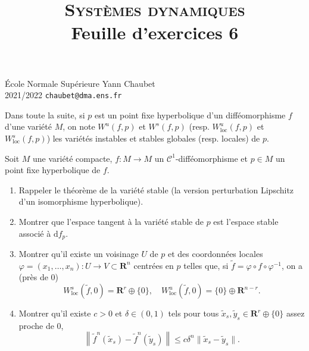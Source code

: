 \documentclass[a4paper,10pt,openany]{article}
\title{\textsc{Syst\`emes dynamiques} \\ Feuille d'exercices 6}
\date{}
\author{}
\theoremstyle{plain}
\theoremstyle{definition}
\newcommand{\dd}{\mathrm{d}}
\newcommand{\R}{\mathbf{R}}
\begin{document}
{\noindent \'Ecole Normale Sup\'erieure  \hfill Yann Chaubet } \\
{2021/2022 \hfill \texttt{chaubet@dma.ens.fr}}
{\let\newpage\relax\maketitle}
\maketitle
\noindent Dans toute la suite, si $p$ est un point fixe hyperbolique d'un diff\'eomorphisme $f$ d'une vari\'et\'e $M$, on note $W^u(f,p)$ et $W^s(f,p)$ (resp. $W^u_\mathrm{loc}(f,p)$ et $W^s_\mathrm{loc}(f,p)$) les vari\'et\'es instables et stables globales (resp. locales) de $p$.

\vspace{0.6cm}

 \vspace{1.5mm} 

\noindent Soit $M$ une vari\'et\'e compacte, $f : M \to M$ un $\mathcal{C}^1$-diff\'eomorphisme et $p \in M$ un point fixe hyperbolique de $f$. 
\begin{enumerate}
\item Rappeler le th\'eor\`eme de la vari\'et\'e stable (la version perturbation Lipschitz d'un isomorphisme hyperbolique).
\item Montrer que l'espace tangent \`a la vari\'et\'e stable de $p$ est l'espace stable associ\'e \`a $\dd f_p$.
\item Montrer qu'il existe un voisinage $U$ de $p$ et des coordonn\'ees locales $\varphi = (x_1, \dots, x_n) : U \to V \subset \R^n$ centr\'ees en $p$ telles que, si $\tilde{f} = \varphi \circ f \circ \varphi^{-1}$, on a (pr\`es de $0$)
$$
W^s_\mathrm{loc}(\tilde{f}, 0) = \R^r \oplus \{0\}, \quad W^u_\mathrm{loc}(\tilde{f}, 0) = \{0\}\oplus \R^{n-r}.
$$
\item Montrer qu'il existe $c>0$ et $\delta \in (0,1)$ tels pour tous $\tilde{x}_s, \tilde{y}_s \in \R^r \oplus \{0\}$ assez proche de $0$, 
$$
\left\|\tilde{f}^n(\tilde{x}_s) - \tilde{f}^n(\tilde{y}_s)\right\| \leq c \delta^n \|\tilde{x}_s - \tilde{y}_s\|.
$$
\end{enumerate}

\vspace{0.6cm}

 \vspace{1.5mm} 
\end{document}
